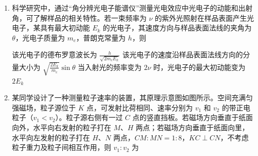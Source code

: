 \documentclass[\gkver]{gaokaozhenti}
\begin{document}
\begin{enumerate}
{已知光进入棱镜后垂直射到镜面 $MN$ 上，可得棱镜内的折射角：$r=90^{\circ}-60^{\circ}=30^{\circ}$

根据折射定律 $n=\frac{\sin i}{\sin r}$

代入数值：$n=\frac{\sin45^{\circ}}{\sin30^{\circ}}=\sqrt{2}$，故 AB 错误；

CD．全反射临界角 $C$ 满足 $\sin C=\frac{1}{n}$，代入得：$\sin C=\frac{1}{\sqrt{2}}\Rightarrow C=45^{\circ}$，故 C 正确，D 错误。

故选 C。
}
\item
科学研究中，通过“角分辨光电子能谱仪”测量光电效应中光电子的动能和出射角，可了解样品的相关特性。若一束频率为 $\nu$ 的紫外光照射在样品表面产生光电子，某具有最大初动能 $E_{k}$ 的光电子，其速度方向与样品表面法线的夹角为 $\theta$，光电子质量为 $m_{c}$，普朗克常量为 $h$，则 

{该光电子的德布罗意波长为 $\frac{h}{\sqrt{2m_{c}E_{k}}}$}
{该光电子的速度沿样品表面法线方向的分量大小为 $\sqrt{\frac{2E_{k}}{m_{c}}}\sin\theta$}
{当入射光的频率变为 $2\nu$ 时，光电子的最大初动能变为 $2E_{k}$}


\item
某同学设计了一种测量粒子速率的装置，其原理示意图如图所示。空间充满匀强磁场，粒子源位于 $K$ 点，可发射比荷相同、速率分别为 $v_{1}$ 和 $v_{2}$ 的带正电粒子（$v_{1}<v_{2}$）。粒子源右侧有一过 $C$ 点的竖直挡板。若磁场方向垂直于纸面向外，水平向右发射的粒子打在 $M$、$H$ 两点；若磁场方向垂直于纸面向里，水平向左发射的粒子打在 $H$、$N$ 两点，$CM:MN=1:8$，$KC\perp CN$，不考虑粒子重力及粒子间相互作用，则 $v_{1}:v_{2}$ 为 
\onepicture[h=5.2cm]{}


\end{enumerate}
\end{document}

